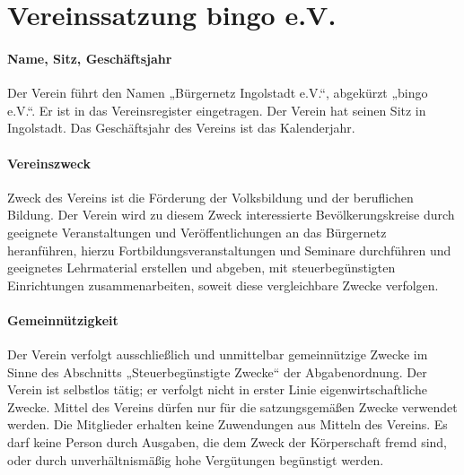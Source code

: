 \section{Vereinssatzung bingo e.V.}

\begin{multicols}{2}

\paragraph{Name, Sitz, Geschäftsjahr}
Der Verein führt den Namen „Bürgernetz Ingolstadt e.V.“, abgekürzt „bingo
e.V.“. Er ist in das Vereinsregister eingetragen. Der Verein hat seinen Sitz in
Ingolstadt. Das Geschäftsjahr des Vereins ist das Kalenderjahr.

\paragraph{Vereinszweck}
Zweck des Vereins ist die Förderung der Volksbildung und der beruflichen
Bildung. Der Verein wird zu diesem Zweck interessierte Bevölkerungskreise
durch geeignete Veranstaltungen und Veröffentlichungen an das Bürgernetz
heranführen, hierzu Fortbildungsveranstaltungen und Seminare
durchführen und geeignetes Lehrmaterial erstellen und abgeben, mit
steuerbegünstigten Einrichtungen zusammenarbeiten, soweit diese
vergleichbare Zwecke verfolgen.

\paragraph{Gemeinnützigkeit}
Der Verein verfolgt ausschließlich und unmittelbar gemeinnützige Zwecke
im Sinne des Abschnitts „Steuerbegünstigte Zwecke“ der Abgabenordnung.
Der Verein ist selbstlos tätig; er verfolgt nicht in erster Linie
eigenwirtschaftliche Zwecke. Mittel des Vereins dürfen nur für die
satzungsgemäßen Zwecke verwendet werden. Die Mitglieder erhalten keine
Zuwendungen aus Mitteln des Vereins. Es darf keine Person durch
Ausgaben, die dem Zweck der Körperschaft fremd sind, oder durch
unverhältnismäßig hohe Vergütungen begünstigt werden.


\end{multicols}
